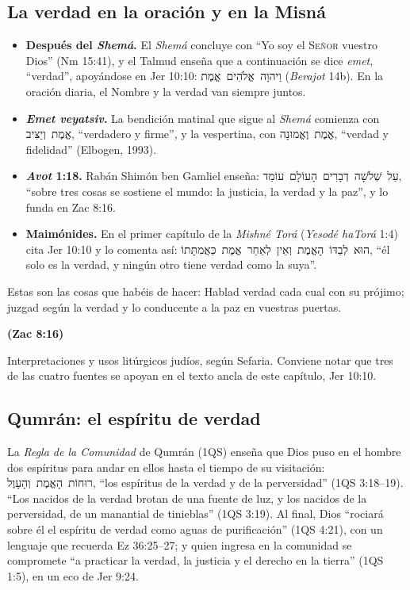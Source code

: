 \documentclass[11pt,letterpaper]{article}
\newcommand{\heb}[1]{\mbox{\foreignlanguage{hebrew}{#1}}}
\newcommand{\SENOR}{\textsc{Señor}}
\newcommand{\fuente}[1]{\par\hfill{\upshape\bfseries\small\textcolor{azul}{#1}}}
\begin{document}
\subsection{La verdad en la oración y en la Misná}
\begin{itemize}
\item \textbf{Después del \emph{Shemá}.} El \emph{Shemá} concluye con ``Yo soy el \SENOR{} vuestro Dios'' (Nm 15:41), y el Talmud enseña que a continuación se dice \emph{emet}, ``verdad'', apoyándose en Jer 10:10: \heb{וַיהוָה אֱלֹהִים אֱמֶת} (\emph{Berajot} 14b). En la oración diaria, el Nombre y la verdad van siempre juntos.
\item \textbf{\emph{Emet veyatsiv}.} La bendición matinal que sigue al \emph{Shemá} comienza con \heb{אֱמֶת וְיַצִּיב}, ``verdadero y firme'', y la vespertina, con \heb{אֱמֶת וֶאֱמוּנָה}, ``verdad y fidelidad'' (Elbogen, 1993).
\item \textbf{\emph{Avot} 1:18.} Rabán Shimón ben Gamliel enseña: \heb{עַל שְׁלֹשָׁה דְבָרִים הָעוֹלָם עוֹמֵד}, ``sobre tres cosas se sostiene el mundo: la justicia, la verdad y la paz'', y lo funda en Zac 8:16.
\item \textbf{Maimónides.} En el primer capítulo de la \emph{Mishné Torá} (\emph{Yesodé haTorá} 1:4) cita Jer 10:10 y lo comenta así: \heb{הוּא לְבַדּוֹ הָאֱמֶת וְאֵין לְאַחֵר אֱמֶת כַּאֲמִתָּתוֹ}, ``él solo es la verdad, y ningún otro tiene verdad como la suya''.
\end{itemize}

\begin{cita}Estas son las cosas que habéis de hacer: Hablad verdad cada cual con su prójimo; juzgad según la verdad y lo conducente a la paz en vuestras puertas.\fuente{(Zac 8:16)}\end{cita}

\begin{nota}[Precisión]
Interpretaciones y usos litúrgicos judíos, según Sefaria. Conviene notar que tres de las cuatro fuentes se apoyan en el texto ancla de este capítulo, Jer 10:10.
\end{nota}

\subsection{Qumrán: el espíritu de verdad}
La \emph{Regla de la Comunidad} de Qumrán (1QS) enseña que Dios puso en el hombre dos espíritus para andar en ellos hasta el tiempo de su visitación: \heb{רוּחוֹת הָאֱמֶת וְהָעָוֶל}, ``los espíritus de la verdad y de la perversidad'' (1QS 3:18--19). ``Los nacidos de la verdad brotan de una fuente de luz, y los nacidos de la perversidad, de un manantial de tinieblas'' (1QS 3:19). Al final, Dios ``rociará sobre él el espíritu de verdad como aguas de purificación'' (1QS 4:21), con un lenguaje que recuerda Ez 36:25--27; y quien ingresa en la comunidad se compromete ``a practicar la verdad, la justicia y el derecho en la tierra'' (1QS 1:5), en un eco de Jer 9:24.
\end{document}
